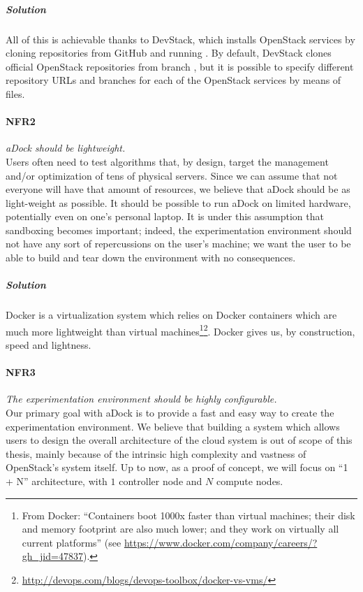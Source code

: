 \subparagraph{Solution} All of this is achievable thanks to DevStack, which installs OpenStack services by cloning repositories from GitHub and running . By default, DevStack clones official OpenStack repositories from branch , but it is possible to specify different repository URLs and branches for each of the OpenStack services by means of  files.

\paragraph{NFR2}\label{p:nfr2} \emph{aDock should be lightweight.} \hfill \\
Users often need to test algorithms that, by design, target the management and/or optimization of tens of physical servers. Since we can assume that not everyone will have that amount of resources, we believe that aDock should be as light-weight as possible. It should be possible to run aDock on limited hardware, potentially even on one's personal laptop. It is under this assumption that sandboxing becomes important; indeed, the experimentation environment should not have any sort of repercussions on the user's machine; we want the user to be able to build and tear down the environment with no consequences.

\subparagraph{Solution} Docker is a virtualization system which relies on Docker containers which are much more lightweight than virtual machines\footnote{From Docker: ``Containers boot 1000x faster than virtual machines; their disk and memory footprint are also much lower; and they work on virtually all current platforms'' (see \url{https://www.docker.com/company/careers/?gh_jid=47837}).}\footnote{\url{http://devops.com/blogs/devops-toolbox/docker-vs-vms/}}. Docker gives us, by construction, speed and lightness.

\paragraph{NFR3}\label{p:nfr3} \emph{The experimentation environment should be highly configurable.} \hfill \\
Our primary goal with aDock is to provide a fast and easy way to create the experimentation environment. We believe that building a system which allows users to design the overall architecture of the cloud system is out of scope of this thesis, mainly because of the intrinsic high complexity and vastness of OpenStack's system itself. Up to now, as a proof of concept, we will focus on ``1 + N'' architecture, with $1$ controller node and $N$ compute nodes.

